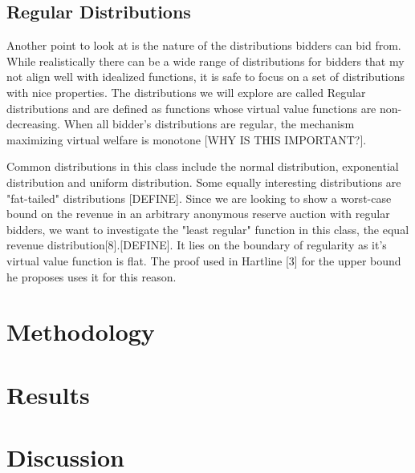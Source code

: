 \documentclass{acm_proc_article-sp}
\begin{document}
\subsection{Regular Distributions}
Another point to look at is the nature of the distributions bidders can bid from. While realistically there can be a wide range of distributions for bidders that my not align well with idealized functions, it is safe to focus on a set of distributions with nice properties. The distributions we will explore are called Regular distributions and are defined as functions whose virtual value functions are non-decreasing. When all bidder's distributions are regular, the mechanism maximizing virtual welfare is monotone [WHY IS THIS IMPORTANT?]. 

Common distributions in this class include the normal distribution, exponential distribution and uniform distribution. Some equally interesting distributions are "fat-tailed" distributions [DEFINE]. Since we are looking to show a worst-case bound on the revenue in an arbitrary anonymous reserve auction with regular bidders, we want to investigate the "least regular" function in this class, the equal revenue distribution[8].[DEFINE]. It lies on the boundary of regularity as it's virtual value function is flat. The proof used in Hartline [3] for the upper bound he proposes uses it for this reason.

\section{Methodology}

\section{Results}

\section{Discussion}
\end{document}
